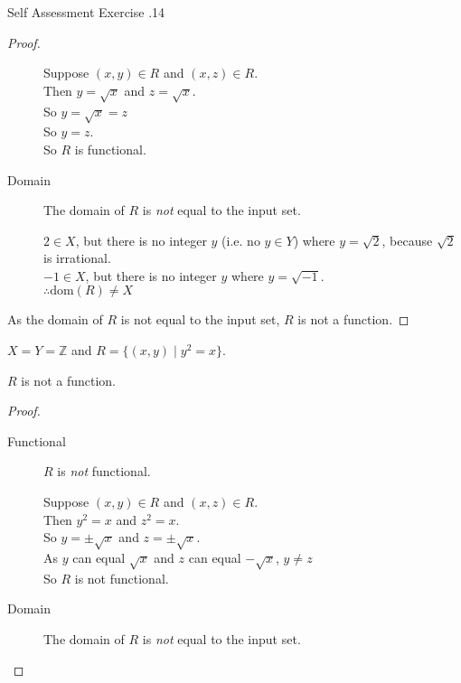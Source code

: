 \documentclass[\main/notes.tex]{subfiles}
\begin{document}
\begin{exercise}{Self Assessment Exercise \thechapter.14}
\begin{questions}
\begin{questions}
\begin{answer}
\begin{proof}
\begin{description}
													\begin{subproof}[Subproof]
														Suppose $(x, y) \in R$ and $(x, z) \in R$.\\
														Then $y = \sqrt{x}$ and $z = \sqrt{x}$.\\
														So $y = \sqrt{x} = z$\\
														So $y = z$.\\
														So $R$ is functional.
													\end{subproof}
												\item[Domain] The domain of $R$ is \emph{not} equal to the input set.
													\begin{subproof}[Counterexample]
														$2 \in X$, but there is no integer $y$ (i.e. no $y \in Y$) where $y = \sqrt{2}$, because $\sqrt{2}$ is irrational.\\
														$-1 \in X$, but there is no integer $y$ where $y = \sqrt{-1}$.\\
														$\therefore \mathrm{dom}(R) \neq X$ 
													\end{subproof}
											\end{description}
											As the domain of $R$ is not equal to the input set, $R$ is not a function.
										\end{proof}
									\end{answer}
								\item $X = Y = \mathbb{Z}$ and $R = \bigl\{(x, y) \mid y^{2} = x\bigr\}$.\\
									\begin{answer}
										$R$ is not a function.
										\begin{proof}
											$ $
											\begin{description}
												\item[Functional] $R$ is \emph{not} functional.
													\begin{subproof}[Subproof]
														Suppose $(x, y) \in R$ and $(x, z) \in R$.\\
														Then $y^{2} = x$ and $z^{2} = x$.\\
														So $y = \pm \sqrt{x}$ and $z = \pm \sqrt{x}$.\\
														As $y$ can equal $\sqrt{x}$ and $z$ can equal $- \sqrt{x}$, $y \neq z$\\
														So $R$ is not functional.
													\end{subproof}
												\item[Domain] The domain of $R$ is \emph{not} equal to the input set.

\end{description}
\end{proof}
\end{answer}
\end{questions}
\end{questions}
\end{exercise}
\end{document}
